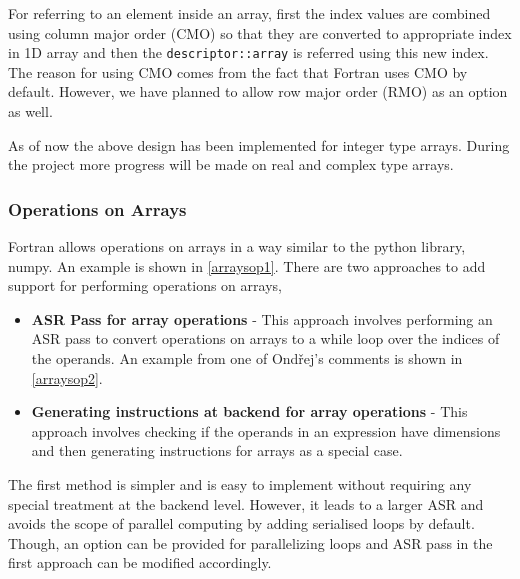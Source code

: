

For referring to an element inside an array, first the index values are combined using column major order (CMO) so that they are converted to appropriate index in 1D array and then the \texttt{descriptor::array} is referred using this new index. The reason for using CMO comes from the fact that Fortran uses CMO by default. However, we have planned to allow row major order (RMO) as an option as well.

As of now the above design has been implemented for integer type arrays. During the project more progress will be made on real and complex type arrays.

\subsubsection{Operations on Arrays}

Fortran allows operations on arrays in a way similar to the python library, numpy. An example is shown in \ref{arraysop1}. There are two approaches to add support for performing operations on arrays,



\begin{itemize}

\item \textbf{ASR Pass for array operations} - This approach involves performing an ASR pass to convert operations on arrays to a while loop over the indices of the operands. An example from one of Ondřej's comments is shown in \ref{arraysop2}.

\item \textbf{Generating instructions at backend for array operations} - This approach involves checking if the operands in an expression have dimensions and then generating instructions for arrays as a special case.

\end{itemize}

The first method is simpler and is easy to implement without requiring any special treatment at the backend level. However, it leads to a larger ASR and avoids the scope of parallel computing by adding serialised loops by default. Though, an option can be provided for parallelizing loops and ASR pass in the first approach can be modified accordingly.

